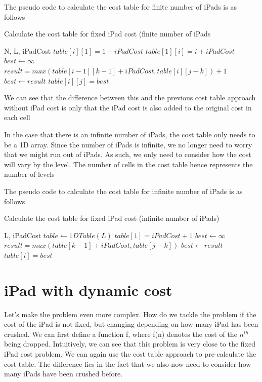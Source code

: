 \documentclass[12pt,a4paper,oneside]{report}
\begin{document}
The pseudo code to calculate the cost table for finite number of iPads is as follows

\begin{algorithm}[H]
\caption{Calculate the cost table for fixed iPad cost (finite number of iPads}
\begin{algorithmic}[1]
\REQUIRE N, L, iPadCost
	\STATE $table[i][1] = 1+iPadCost$
\ENDFOR
{}
	\STATE $table[1][i] = i+iPadCost$
\ENDFOR
{}
		\STATE $best \leftarrow \infty$
			\STATE $result = max(table[i - 1][k - 1]+iPadCost, table[i][j - k]) + 1$
				\STATE $best \leftarrow result$
			\ENDIF
		\ENDFOR
		\STATE $table[i][j] = best$
	\ENDFOR
\ENDFOR
\end{algorithmic}
\end{algorithm}

We can see that the difference between this and the previous cost table approach without iPad cost is only that the iPad cost is also added to the original cost in each cell

In the case that there is an infinite number of iPads, the cost table only needs to be a 1D array. Since the number of iPads is infinite, we no longer need to worry that we might run out of iPads. As such, we only need to consider how the cost will vary by the level. The number of cells in the cost table hence represents the number of levels

The pseudo code to calculate the cost table for infinite number of iPads is as follows

\begin{algorithm}[H]
\caption{Calculate the cost table for fixed iPad cost (infinite number of iPads)}
\begin{algorithmic}[1]
\REQUIRE L, iPadCost
\STATE $table \leftarrow 1DTable(L)$
\STATE $table[1] = iPadCost+1$
	\STATE $best \leftarrow \infty$
		\STATE $result = max(table[k - 1] + iPadCost, table[j - k])$
			\STATE $best \leftarrow result$
		\ENDIF
	\ENDFOR
	\STATE $table[i] = best$
\ENDFOR
\end{algorithmic}
\end{algorithm}

\section{iPad with dynamic cost}
Let's make the problem even more complex. How do we tackle the problem if the cost of the iPad is not fixed, but changing depending on how many iPad has been crushed. 
We can first define a function f, where f(n) denotes the cost of the $n^{th}$ being dropped.
Intuitively, we can see that this problem is very close to the fixed iPad cost problem. We can again use the cost table approach to pre-calculate the cost table. The difference lies in the fact that we also now need to consider how many iPads have been crushed before.
\end{document}
